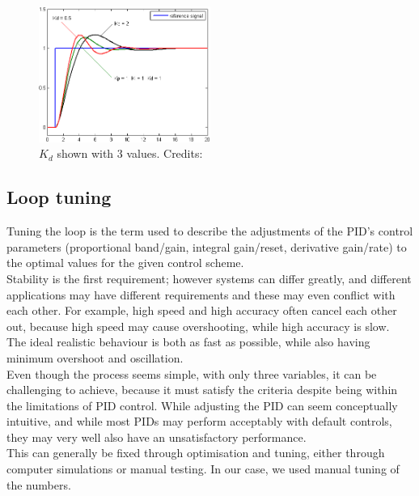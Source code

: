 \begin{figure}[h!]
  \centering
  \includegraphics[width=0.5\textwidth]{figures/Change_with_Kd.png}
  
  \caption{$K_d$ shown with 3 values. Credits: %
  }
  \label{PID controller}
\end{figure}



\subsection {Loop tuning} 

Tuning the loop is the term used to describe the adjustments of the PID’s control parameters (proportional band/gain, integral gain/reset, derivative gain/rate) to the optimal values for the given control scheme. \\ Stability is the first requirement; however systems can differ greatly, and different applications may have different requirements and these may even conflict with each other. For example, high speed and high accuracy often cancel each other out, because high speed may cause overshooting, while high accuracy is slow.\\ The ideal realistic behaviour is both as fast as possible, while also having minimum overshoot and oscillation. \\ 

Even though the process seems simple, with only three variables, it can be challenging to achieve, because it must satisfy the criteria despite being within the limitations of PID control. While adjusting the PID can seem conceptually intuitive, and while most PIDs may perform acceptably with default controls, they may very well also have an unsatisfactory performance.\\ This can generally be fixed through optimisation and tuning, either through computer simulations or manual testing. In our case, we used manual tuning of the numbers.

